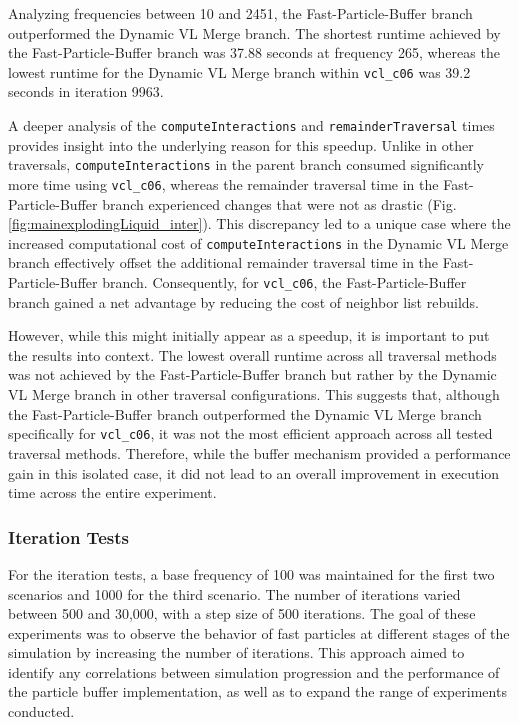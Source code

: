 Analyzing frequencies between 10 and 2451, the Fast-Particle-Buffer branch outperformed the Dynamic VL Merge branch. The shortest runtime achieved by the Fast-Particle-Buffer branch was 37.88 seconds at frequency 265, whereas the lowest runtime for the Dynamic VL Merge branch within \texttt{vcl\_c06} was 39.2 seconds in iteration 9963. 


A deeper analysis of the \texttt{computeInteractions} and \texttt{remainderTraversal} times provides insight into the underlying reason for this speedup. Unlike in other traversals, \texttt{computeInteractions} in the parent branch consumed significantly more time using \texttt{vcl\_c06}, whereas the remainder traversal time in the Fast-Particle-Buffer branch experienced changes that were not as drastic (Fig. \ref{fig:mainexplodingLiquid_inter}). This discrepancy led to a unique case where the increased computational cost of \texttt{computeInteractions} in the Dynamic VL Merge branch effectively offset the additional remainder traversal time in the Fast-Particle-Buffer branch. Consequently, for \texttt{vcl\_c06}, the Fast-Particle-Buffer branch gained a net advantage by reducing the cost of neighbor list rebuilds.

However, while this might initially appear as a speedup, it is important to put the results into context. The lowest overall runtime across all traversal methods was not achieved by the Fast-Particle-Buffer branch but rather by the Dynamic VL Merge branch in other traversal configurations. This suggests that, although the Fast-Particle-Buffer branch outperformed the Dynamic VL Merge branch specifically for \texttt{vcl\_c06}, it was not the most efficient approach across all tested traversal methods. Therefore, while the buffer mechanism provided a performance gain in this isolated case, it did not lead to an overall improvement in execution time across the entire experiment.




\subsubsection{Iteration Tests}


For the iteration tests, a base frequency of 100 was maintained for the first two scenarios and 1000 for the third scenario. The number of iterations varied between 500 and 30,000, with a step size of 500 iterations. The goal of these experiments was to observe the behavior of fast particles at different stages of the simulation by increasing the number of iterations. This approach aimed to identify any correlations between simulation progression and the performance of the particle buffer implementation, as well as to expand the range of experiments conducted.

